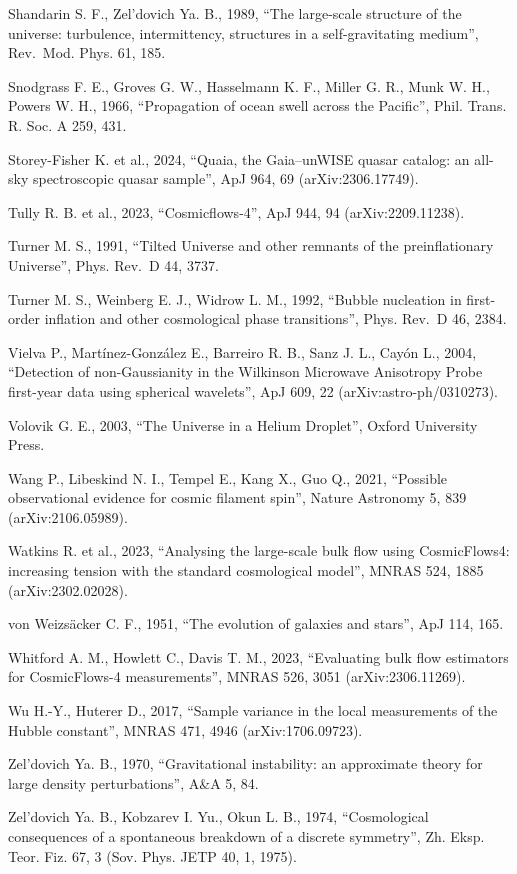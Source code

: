 \documentclass[
  11pt,
]{article}
\begin{document}
Shandarin S. F., Zel'dovich Ya. B., 1989, ``The large-scale structure of
the universe: turbulence, intermittency, structures in a
self-gravitating medium'', Rev.~Mod. Phys. 61, 185.

Snodgrass F. E., Groves G. W., Hasselmann K. F., Miller G. R., Munk W.
H., Powers W. H., 1966, ``Propagation of ocean swell across the
Pacific'', Phil. Trans. R. Soc. A 259, 431.

Storey-Fisher K. et al., 2024, ``Quaia, the Gaia--unWISE quasar catalog:
an all-sky spectroscopic quasar sample'', ApJ 964, 69
(arXiv:2306.17749).

Tully R. B. et al., 2023, ``Cosmicflows-4'', ApJ 944, 94
(arXiv:2209.11238).

Turner M. S., 1991, ``Tilted Universe and other remnants of the
preinflationary Universe'', Phys. Rev.~D 44, 3737.

Turner M. S., Weinberg E. J., Widrow L. M., 1992, ``Bubble nucleation in
first-order inflation and other cosmological phase transitions'', Phys.
Rev.~D 46, 2384.

Vielva P., Martínez-González E., Barreiro R. B., Sanz J. L., Cayón L.,
2004, ``Detection of non-Gaussianity in the Wilkinson Microwave
Anisotropy Probe first-year data using spherical wavelets'', ApJ 609, 22
(arXiv:astro-ph/0310273).

Volovik G. E., 2003, ``The Universe in a Helium Droplet'', Oxford
University Press.

Wang P., Libeskind N. I., Tempel E., Kang X., Guo Q., 2021, ``Possible
observational evidence for cosmic filament spin'', Nature Astronomy 5,
839 (arXiv:2106.05989).

Watkins R. et al., 2023, ``Analysing the large-scale bulk flow using
CosmicFlows4: increasing tension with the standard cosmological model'',
MNRAS 524, 1885 (arXiv:2302.02028).

von Weizsäcker C. F., 1951, ``The evolution of galaxies and stars'', ApJ
114, 165.

Whitford A. M., Howlett C., Davis T. M., 2023, ``Evaluating bulk flow
estimators for CosmicFlows-4 measurements'', MNRAS 526, 3051
(arXiv:2306.11269).

Wu H.-Y., Huterer D., 2017, ``Sample variance in the local measurements
of the Hubble constant'', MNRAS 471, 4946 (arXiv:1706.09723).

Zel'dovich Ya. B., 1970, ``Gravitational instability: an approximate
theory for large density perturbations'', A\&A 5, 84.

Zel'dovich Ya. B., Kobzarev I. Yu., Okun L. B., 1974, ``Cosmological
consequences of a spontaneous breakdown of a discrete symmetry'', Zh.
Eksp. Teor. Fiz. 67, 3 (Sov. Phys. JETP 40, 1, 1975).
\end{document}
